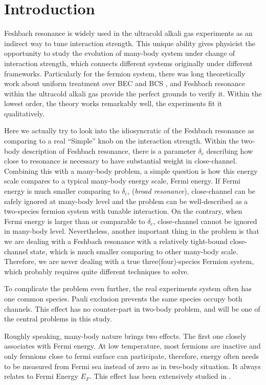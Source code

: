 
\chapter{Introduction}
Feshbach resonance is widely used in the ultracold alkali gas experiments as an indirect way to tune interaction strength.  This unique ability gives physicist the opportunity to study the evolution of many-body system under change of interaction strength, which connects different systems originally under different frameworks.  Particularly for the fermion system, there was long theoretically work about uniform treatment over BEC and BCS \cite{Eagle,LeggettCrossover,Nozieres,RanderiaBEC}, and Feshbach resonance within the ultracold alkali gas provide the perfect grounds to verify it.  Within the lowest order, the theory works remarkably well, the experiments fit it qualitatively.  

Here we actually try to look into the idiosyncratic of the Feshbach resonance as comparing to a real ``Simple'' knob on the interaction strength.  Within the two-body description of Feshbach resonance, there is a parameter $\delta_c$ describing how close to resonance is necessary to have substantial weight in close-channel.  Combining this with a many-body problem, a simple question is how this energy scale compares to a typical many-body energy scale, Fermi energy.  If Fermi energy is much smaller comparing to $\delta_c$, (\emph{broad resonance}), close-channel can be safely ignored at many-body level and the problem can be well-described as a two-species fermion system with tunable interaction.  On the contrary, when Fermi energy is larger than or comparable to $\delta_c$, close-channel cannot be ignored in many-body level.  Nevertheless, another important thing in the problem is that we are dealing with a Feshbach resonance with a relatively tight-bound close-channel state, which is much smaller comparing to other many-body scale.  Therefore, we are never dealing with a true three(four)-species Fermion system, which probably requires quite different techniques to solve.

To complicate the problem even further, the real experiments system often has one common species.  Pauli exclusion prevents the same species occupy both channels.  This effect has no counter-part in two-body problem, and will be one of the central problems in this study. 

Roughly speaking, many-body nature brings two effects.  The first one closely associates with Fermi energy.  At low temperature, most fermions are inactive and only fermions close to fermi surface can participate, therefore, energy often needs to be measured from Fermi sea instead of zero as in two-body situation.  It always relates to Fermi Energy $E_F$.  This effect has been extensively studied in \cite{GurarieNarrow}.

